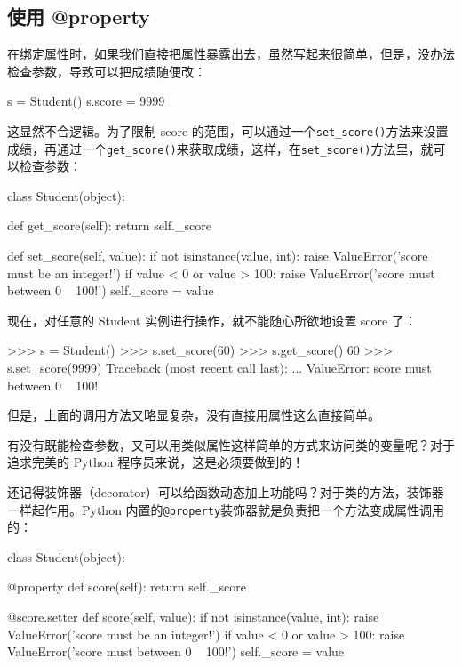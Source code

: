 \hypertarget{ux4f7fux7528-property}{%
\subsection{使用 @property}\label{ux4f7fux7528-property}}

在绑定属性时，如果我们直接把属性暴露出去，虽然写起来很简单，但是，没办法检查参数，导致可以把成绩随便改：

\begin{pythoncode}
s = Student()
s.score = 9999
\end{pythoncode}

这显然不合逻辑。为了限制 score
的范围，可以通过一个\texttt{set\_score()}方法来设置成绩，再通过一个\texttt{get\_score()}来获取成绩，这样，在\texttt{set\_score()}方法里，就可以检查参数：

\begin{pythoncode}
class Student(object):

    def get_score(self):
         return self._score

    def set_score(self, value):
        if not isinstance(value, int):
            raise ValueError('score must be an integer!')
        if value < 0 or value > 100:
            raise ValueError('score must between 0 ~ 100!')
        self._score = value
\end{pythoncode}

现在，对任意的 Student 实例进行操作，就不能随心所欲地设置 score 了：

\begin{pythoncode}
>>> s = Student()
>>> s.set_score(60) 
>>> s.get_score()
60
>>> s.set_score(9999)
Traceback (most recent call last):
  ...
ValueError: score must between 0 ~ 100!
\end{pythoncode}

但是，上面的调用方法又略显复杂，没有直接用属性这么直接简单。

有没有既能检查参数，又可以用类似属性这样简单的方式来访问类的变量呢？对于追求完美的
Python 程序员来说，这是必须要做到的！

还记得装饰器（decorator）可以给函数动态加上功能吗？对于类的方法，装饰器一样起作用。Python
内置的\texttt{@property}装饰器就是负责把一个方法变成属性调用的：

\begin{pythoncode}
class Student(object):

    @property
    def score(self):
        return self._score

    @score.setter
    def score(self, value):
        if not isinstance(value, int):
            raise ValueError('score must be an integer!')
        if value < 0 or value > 100:
            raise ValueError('score must between 0 ~ 100!')
        self._score = value
\end{pythoncode}

